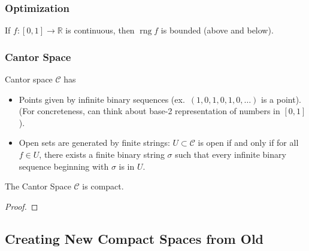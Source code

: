 \documentclass[11pt]{article}
\numberwithin{equation}{section}
\newcounter{theo}[section]\setcounter{theo}{0}
\theoremstyle{definition}
\theoremstyle{definition}
\def\ss{\subset}
\newcommand{\1}{\mathbbm 1}
\newcommand{\RR}{\mathbb R}
\newcommand{\cC}{\mathcal C}
\DeclareMathOperator{\range}{rng}
\begin{document}
\subsubsection{Optimization}


\begin{theorem}
	If $f:[0,1]\to \RR$ is continuous, then $\range{f}$ is bounded (above and below).
\end{theorem}

\subsubsection{Cantor Space}

Cantor space $\cC$ has 
\begin{itemize}
	\item Points given by infinite binary sequences (ex.\ $(1,0,1,0,1,0,\ldots)$ is a point). (For concreteness, can think about base-2 representation of numbers in $[0,1]$).
	\item Open sets are generated by finite strings: $U \ss \cC$ is open if and only if for all $f \in U$, there exists a finite binary string $\sigma$ such that every infinite binary sequence beginning with $\sigma$ is in $U$.   
\end{itemize}

\begin{theorem}[]
	The Cantor Space $\cC$ is compact. 
\end{theorem}
\begin{proof}
	
\end{proof}




\subsection{Creating New Compact Spaces from Old}
\end{document}
